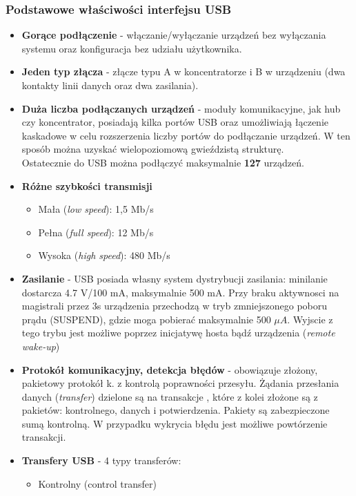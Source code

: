 		\subsubsection{Podstawowe właściwości interfejsu USB}
		\begin{itemize}
			\item \textbf{Gorące podłączenie} - włączanie/wyłączanie urządzeń bez wyłączania systemu oraz konfiguracja bez udziału użytkownika.
			\item \textbf{Jeden typ złącza} - złącze typu A w koncentratorze i B w urządzeniu (dwa kontakty linii danych oraz dwa zasilania).
			\item \textbf{Duża liczba podłączanych urządzeń} - moduły komunikacyjne, jak hub czy koncentrator, posiadają kilka portów USB oraz umożliwiają łączenie kaskadowe w celu rozszerzenia liczby portów do podłączanie urządzeń. W ten sposób można uzyskać wielopoziomową gwieździstą strukturę.\\Ostatecznie do USB można podłączyć maksymalnie \textbf{127} urządzeń.
			\item \textbf{Różne szybkości transmisji}
			\begin{itemize}
				\item Mała (\emph{low speed}): 1,5 Mb/s
				\item Pełna (\emph{full speed}): 12 Mb/s
				\item Wysoka (\emph{high speed}): 480 Mb/s
			\end{itemize}
			\item \textbf{Zasilanie} - USB posiada własny system dystrybucji zasilania: minilanie dostarcza 4.7 V/100 mA, maksymalnie 500 mA. Przy braku aktywnosci na magistrali przez 3s urządzenia przechodzą w tryb zmniejszonego poboru prądu (SUSPEND), gdzie moga pobierać maksymalnie 500 $\mu A$. Wyjscie z tego trybu jest możliwe poprzez inicjatywę hosta bądź urządzenia (\emph{remote wake-up})
			\item \textbf{Protokół komunikacyjny, detekcja błędów} - obowiązuje złożony, pakietowy protokół k. z kontrolą poprawności przesyłu. Żądania przesłania danych (\emph{transfer}) dzielone są na transakcje , które z kolei złożone są z pakietów: kontrolnego, danych i potwierdzenia. Pakiety są zabezpieczone sumą kontrolną. W przypadku wykrycia błędu jest możliwe powtórzenie transakcji.
			\item \textbf{Transfery USB} - 4 typy transferów:
				\begin{itemize}
					\item Kontrolny (control transfer)

\end{itemize}
\end{itemize}
